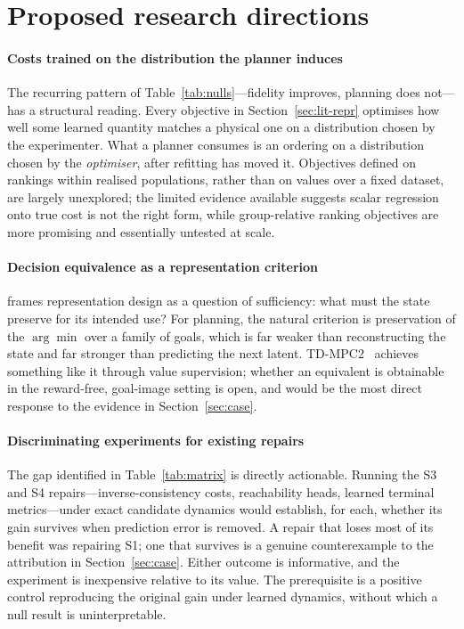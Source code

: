 \documentclass[11pt,letterpaper]{article}
\begin{document}
\section{Proposed research directions}\label{sec:open}

\paragraph{Costs trained on the distribution the planner induces}
The recurring pattern of Table~\ref{tab:nulls}---fidelity improves, planning does
not---has a structural reading. Every objective in Section~\ref{sec:lit-repr}
optimises how well some learned quantity matches a physical one on a distribution
chosen by the experimenter. What a planner consumes is an ordering on a
distribution chosen by the \emph{optimiser}, after refitting has moved it.
Objectives defined on rankings within realised populations, rather than on values
over a fixed dataset, are largely unexplored; the limited evidence available
suggests scalar regression onto true cost is not the right form, while
group-relative ranking objectives are more promising and essentially untested at
scale.

\paragraph{Decision equivalence as a representation criterion}
\citet{kim2026latentstate} frames representation design as a question of
sufficiency: what must the state preserve for its intended use? For planning, the
natural criterion is preservation of the $\arg\min$ over a family of goals, which
is far weaker than reconstructing the state and far stronger than predicting the
next latent. TD-MPC2~\citep{hansen2024tdmpc2} achieves something like it through
value supervision; whether an equivalent is obtainable in the reward-free,
goal-image setting is open, and would be the most direct response to the evidence
in Section~\ref{sec:case}.

\paragraph{Discriminating experiments for existing repairs}
The gap identified in Table~\ref{tab:matrix} is directly actionable. Running the
S3 and S4 repairs---inverse-consistency costs, reachability heads, learned
terminal metrics---under exact candidate dynamics would establish, for each,
whether its gain survives when prediction error is removed. A repair that loses
most of its benefit was repairing S1; one that survives is a genuine
counterexample to the attribution in Section~\ref{sec:case}. Either outcome is
informative, and the experiment is inexpensive relative to its value. The
prerequisite is a positive control reproducing the original gain under learned
dynamics, without which a null result is uninterpretable.
\end{document}

